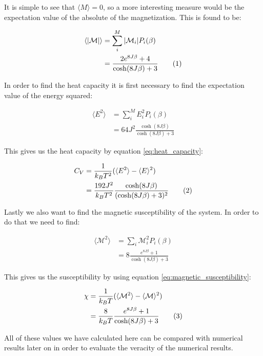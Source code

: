 \documentclass[reprint,english,notitlepage]{revtex4-1}  %
\newcommand\numberthis{\addtocounter{equation}{1}\tag{\theequation}}
\begin{document}
It is simple to see that $\langle M \rangle = 0$, so a more interesting measure would be the expectation value of the absolute of the magnetization. This is found to be:

\begin{align*}
\langle |\mathcal{M}| \rangle &= \sum\limits_i^M |\mathcal{M}_i| P_i(\beta) \\
 &= \frac{2e^{8J\beta} + 4}{\cosh (8 J \beta) + 3} \numberthis \label{eq:2x2_abs_magnetization}
\end{align*}

In order to find the heat capacity it is first necessary to find the expectation value of the energy squared:

\begin{align*}
\langle E^2 \rangle &= \sum\limits_i^M E_i^2 P_i(\beta) \\
&= 64J^2 \frac{\cosh(8J\beta)}{\cosh(8J\beta) + 3}
\end{align*}

This gives us the heat capacity by equation \eqref{eq:heat_capacity}:

\begin{align*}
C_V &= \frac{1}{k_B T^2} ( \langle E^2 \rangle - \langle E \rangle^2) \\
&= \frac{192J^2}{k_B T^2} \frac{\cosh(8J\beta)}{(\cosh(8J\beta) + 3)^2} \numberthis \label{eq:2x2_heat_capacity}
\end{align*}

Lastly we also want to find the magnetic susceptibility of the system. In order to do that we need to find:

\begin{align*}
\langle \mathcal{M}^2 \rangle &= \sum\limits_i \mathcal{M}_i^2 P_i(\beta) \\
&= 8 \frac{e^{8J\beta} + 1}{\cosh(8J\beta) + 3}
\end{align*}

This gives us the susceptibility by using equation \eqref{eq:magnetic_susceptibility}:

\begin{align*}
\chi &= \frac{1}{k_B T} ( \langle \mathcal{M}^2 \rangle - \langle \mathcal{M} \rangle^2 ) \\
&= \frac{8}{k_B T} \frac{e^{8J \beta} + 1}{\cosh( 8J \beta) + 3} \numberthis \label{eq:2x2_susceptibility}
\end{align*}

All of these values we have calculated here can be compared with numerical results later on in order to evaluate the veracity of the numerical results.
\end{document}
